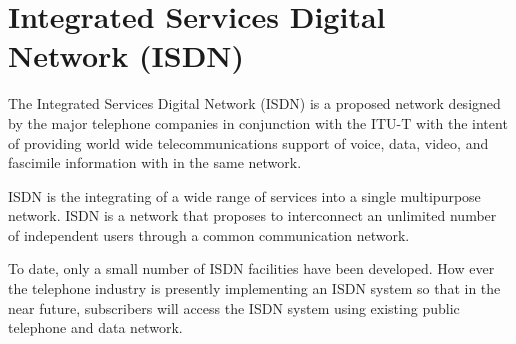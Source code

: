 \section{Integrated Services Digital Network (ISDN)}\label{sec10.4}

The Integrated Services Digital Network (ISDN) is a proposed network designed by the major telephone companies in conjunction with the ITU-T with the intent of providing world wide telecommunications support of voice, data, video, and fascimile information with in the same network.

ISDN is the integrating of a wide range of services into a single multipurpose network. ISDN is a network that proposes to interconnect an unlimited number of independent users through a common communication network.

To date, only a small number of ISDN facilities have been developed. How ever the telephone industry is presently implementing an ISDN system so that in the near future, subscribers will access the ISDN system using existing public telephone and data network.


